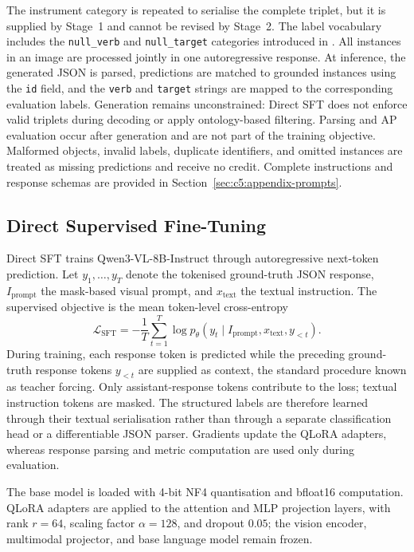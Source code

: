 The instrument category is repeated to serialise the complete triplet, but it is supplied by Stage~1 and cannot be revised by Stage~2. The label vocabulary includes the \texttt{null\_verb} and \texttt{null\_target} categories introduced in . All instances in an image are processed jointly in one autoregressive response. At inference, the generated JSON is parsed, predictions are matched to grounded instances using the \texttt{id} field, and the \texttt{verb} and \texttt{target} strings are mapped to the corresponding evaluation labels. Generation remains unconstrained: Direct SFT does not enforce valid triplets during decoding or apply ontology-based filtering. Parsing and AP evaluation occur after generation and are not part of the training objective. Malformed objects, invalid labels, duplicate identifiers, and omitted instances are treated as missing predictions and receive no credit. Complete instructions and response schemas are provided in Section~\ref{sec:c5:appendix-prompts}.

\subsection{Direct Supervised Fine-Tuning}
\label{sec:c5:direct-sft}

Direct SFT trains Qwen3-VL-8B-Instruct through autoregressive next-token prediction. Let $y_1,\ldots,y_T$ denote the tokenised ground-truth JSON response, $I_{\mathrm{prompt}}$ the mask-based visual prompt, and $x_{\mathrm{text}}$ the textual instruction. The supervised objective is the mean token-level cross-entropy
\begin{equation}
    \mathcal{L}_{\mathrm{SFT}}
    =-\frac{1}{T}\sum_{t=1}^{T}
    \log p_{\theta}\!\left(y_t\mid I_{\mathrm{prompt}},x_{\mathrm{text}},y_{<t}\right).
    \label{eq:c5:sft-loss}
\end{equation}
During training, each response token is predicted while the preceding ground-truth response tokens $y_{<t}$ are supplied as context, the standard procedure known as teacher forcing. Only assistant-response tokens contribute to the loss; textual instruction tokens are masked. The structured labels are therefore learned through their textual serialisation rather than through a separate classification head or a differentiable JSON parser. Gradients update the QLoRA adapters, whereas response parsing and metric computation are used only during evaluation.

The base model is loaded with 4-bit NF4 quantisation and bfloat16 computation. QLoRA adapters are applied to the attention and MLP projection layers, with rank $r=64$, scaling factor $\alpha=128$, and dropout $0.05$; the vision encoder, multimodal projector, and base language model remain frozen.

